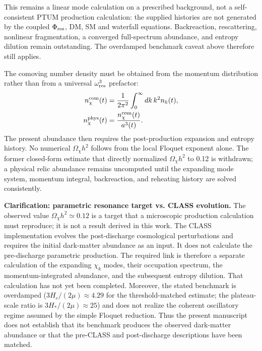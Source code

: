\documentclass[epj]{svjour}
\begin{document}
\begin{description}
This remains a linear mode calculation on a prescribed background,
not a self-consistent PTUM production calculation: the supplied
histories are not generated by the coupled \(\Phi_{\rm res}\), DM,
SM and waterfall equations. Backreaction, rescattering, nonlinear
fragmentation, a converged full-spectrum abundance, and entropy
dilution remain outstanding. The overdamped benchmark caveat above
therefore still applies.

The comoving number density must be obtained from the momentum
distribution rather than from a universal \(\omega_{\rm res}^3\)
prefactor:
\begin{equation}
\begin{aligned}
n_\chi^{\rm com}(t)
&=\frac{1}{2\pi^2}\int_0^\infty dk\,k^2 n_k(t),\\
n_\chi^{\rm phys}(t)&=\frac{n_\chi^{\rm com}(t)}{a^3(t)}.
\end{aligned}
\end{equation}
The present abundance then requires the post-production expansion
and entropy history. No numerical \(\Omega_\chi h^2\) follows from
the local Floquet exponent alone. The former closed-form estimate
that directly normalized \(\Omega_\chi h^2\) to 0.12 is withdrawn;
a physical relic abundance remains uncomputed until the expanding
mode system, momentum integral, backreaction, and reheating history
are solved consistently.

\noindent\textbf{Clarification: parametric resonance target vs. CLASS evolution.}
The observed value \(\Omega_\chi h^2\simeq0.12\) is a target that a
microscopic production calculation must reproduce; it is not a
result derived in this work. The CLASS implementation evolves the
post-discharge cosmological perturbations and requires the initial
dark-matter abundance as an input. It does not calculate the
pre-discharge parametric production. The required link is therefore
a separate calculation of the expanding \(\chi_k\) modes, their
occupation spectrum, the momentum-integrated abundance, and the
subsequent entropy dilution. That calculation has not yet been
completed. Moreover, the stated benchmark is overdamped
(\(3H_c/(2\mu)\approx4.29\) for the threshold-matched estimate; the plateau-scale ratio is \(3H_*/(2\mu)\approx25\)) and does not realize the coherent
oscillatory regime assumed by the simple Floquet reduction. Thus the
present manuscript does not establish that its benchmark produces
the observed dark-matter abundance or that the pre-CLASS and
post-discharge descriptions have been matched.


\end{description}
\end{document}
